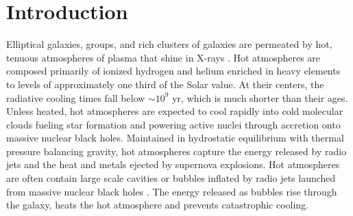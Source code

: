 \documentclass[apjl]{emulateapj}
\begin{document}

\section{Introduction}

Elliptical galaxies, groups, and rich clusters of galaxies are permeated by hot, tenuous atmospheres of plasma that shine in X-rays \citep{Fabian:94}. Hot atmospheres are composed primarily of ionized hydrogen and helium enriched in heavy elements to levels of approximately one third of the Solar value. At their centers, the radiative cooling times fall below $\sim 10^9$ yr, which is much shorter than their ages.  Unless heated, hot atmospheres are expected to cool rapidly into cold molecular clouds fueling star formation and powering active nuclei through accretion onto massive nuclear black holes.  Maintained in hydrostatic equilibrium with thermal pressure balancing gravity, hot atmospheres capture the energy released by radio jets and the heat and metals ejected by supernova explosions. Hot atmospheres are often contain large scale cavities or bubbles inflated by radio jets launched from massive nuclear black holes \citep{McNamara:07, McNamara:12, Fabian:12}. The energy released as bubbles rise through the galaxy, heats the hot atmosphere and prevents catastrophic cooling. 

\end{document}
